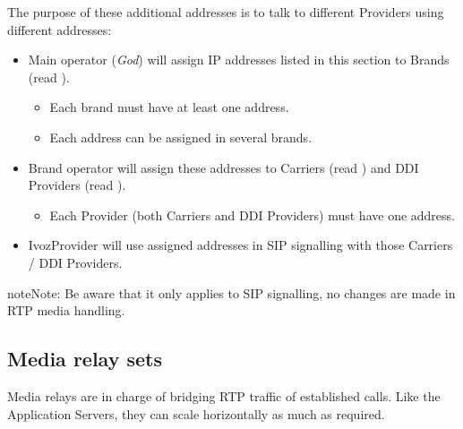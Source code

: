 \documentclass[letterpaper,10pt,english]{sphinxmanual}
\begin{document}
The purpose of these additional addresses is to talk to different Providers using different addresses:
\begin{itemize}
\item {} 
Main operator (\emph{God}) will assign IP addresses listed in this section to Brands (read {\hyperref[administration_portal/platform/brands:brands]{}}).
\begin{itemize}
\item {} 
Each brand must have at least one address.

\item {} 
Each address can be assigned in several brands.

\end{itemize}

\item {} 
Brand operator will assign these addresses to Carriers (read {\hyperref[administration_portal/brand/providers/carriers:carriers]{}}) and DDI Providers (read {\hyperref[administration_portal/brand/providers/ddi_providers:ddi\string-providers]{}}).
\begin{itemize}
\item {} 
Each Provider (both Carriers and DDI Providers) must have one address.

\end{itemize}

\item {} 
IvozProvider will use assigned addresses in SIP signalling with those Carriers / DDI Providers.

\end{itemize}

\begin{notice}{note}{Note:}
Be aware that it only applies to SIP signalling, no changes are made in RTP media handling.
\end{notice}


\subsection{Media relay sets}
\label{administration_portal/platform/infrastructure/media_relay_sets::doc}\label{administration_portal/platform/infrastructure/media_relay_sets:media-relay-sets}
Media relays are in charge of bridging RTP traffic of established calls. Like
the Application Servers, they can scale horizontally as much as required.
\end{document}
